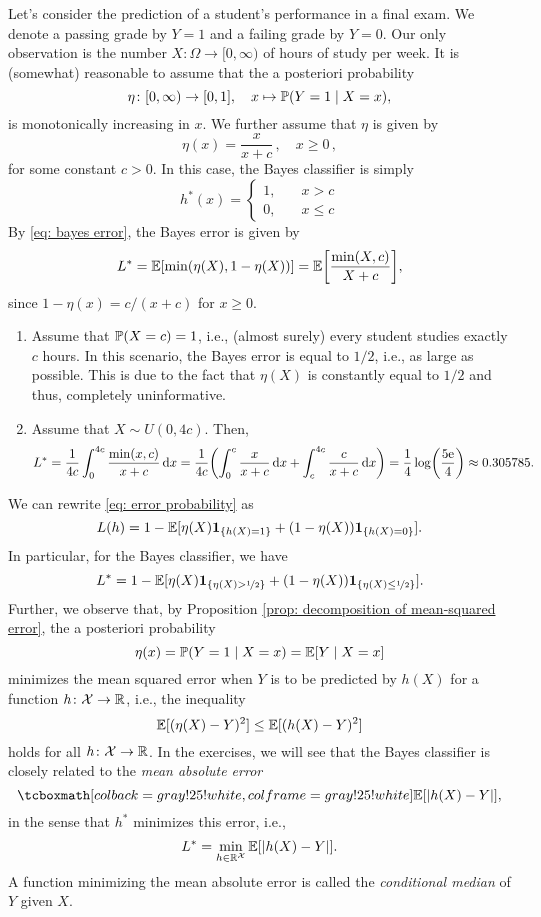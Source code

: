 \begin{example}
Let's consider the prediction of a student's performance in a final exam. We denote a passing grade by $Y = 1$ and a failing grade by $Y = 0$. Our only observation is the number $X \colon \Omega \to [0, \infty)$ of hours of study per week. It is (somewhat) reasonable to assume that the a posteriori probability
\[
    \eta \colon [0, \infty) \to [0, 1], \quad x \mapsto \operatorname{\mathbb{P}}(Y = 1 \mathrel{|} X = x),
\]
is monotonically increasing in $x$. We further assume that $\eta$ is given by
\[
    \eta(x) = \frac{x}{x + c} \, , \quad x \geq 0 \, ,
\]
for some constant $c > 0$. In this case, the Bayes classifier is simply
\[
    h^*(x) = \begin{cases}
        1, \quad & x > c \\
        0, \quad & x \leq c
    \end{cases}
\]
By \eqref{eq: bayes error}, the Bayes error is given by
\[
    L^* = \Exp[\min(\eta(X), 1 - \eta(X))] = \Exp\left[\frac{\min(X, c)}{X + c}\right],
\]
since $1 - \eta(x) = c / (x+c)$ for $x \geq 0$.

\begin{enumerate}
    \item Assume that $\operatorname{\mathbb{P}}(X = c) = 1$, i.e., (almost surely) every student studies exactly $c$ hours. In this scenario, the Bayes error is equal to $1/2$, i.e., as large as possible. This is due to the fact that $\eta(X)$ is constantly equal to $1/2$ and thus, completely uninformative.
    
    \item Assume that $X \sim U(0, 4c)$. Then,
    \[
        L^* = \frac{1}{4c} \int_0^{4c} \frac{\min(x, c)}{x + c} \dx = \frac{1}{4c} \left( \int_0^c \frac{x}{x + c} \dx + \int_c^{4c} \frac{c}{x + c} \dx \right) = \frac{1}{4} \log(\frac{5\e}{4}) \approx 0.305785.
    \]
\end{enumerate}
\end{example}

\begin{remark}
We can rewrite \eqref{eq: error probability} as
\[
    L(h) = 1 - \Exp[\eta(X) \indSet{h(X) = 1} + (1 - \eta(X)) \indSet{h(X) = 0}].
\]
In particular, for the Bayes classifier, we have
\[
    L^* = 1 - \Exp[\eta(X) \indSet{\eta(X) > \nicefrac{1}{2}} + (1 - \eta(X)) \indSet{\eta(X) \leq \nicefrac{1}{2}}].
\]
Further, we observe that, by Proposition \ref{prop: decomposition of mean-squared error}, the a posteriori probability
\[
    \eta(x) = \operatorname{\mathbb{P}}(Y = 1 \mathrel{|} X = x) = \operatorname{\mathbb{E}}[Y \mathrel{|} X = x]
\]
minimizes the mean squared error when $Y$ is to be predicted by $h(X)$ for a function $h \colon \mathcal{X} \to \mathbb{R}$, i.e., the inequality
\[
    \operatorname{\mathbb{E}}[(\eta(X) - Y)^2] \leq \operatorname{\mathbb{E}}[(h(X) - Y)^2]
\]
holds for all $h \colon \mathcal{X} \to \mathbb{R}$. In the exercises, we will see that the Bayes classifier is closely related to the \emph{mean absolute error}
\[
    \highlightMath{
        \Exp[\abs{h(X) - Y}],
    }
\]
in the sense that $h^*$ minimizes this error, i.e.,
\[
    L^* = \min_{h \in \mathbb{R}^{\mathcal{X}}} \operatorname{\mathbb{E}}[\abs{h(X) - Y}].
\]
A function minimizing the mean absolute error is called the \emph{conditional median} of $Y$ given $X$.
\end{remark}


